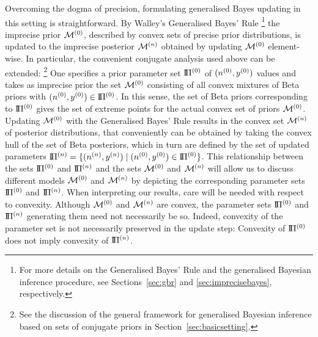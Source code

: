Overcoming the dogma of precision, formulating generalised Bayes
updating in this setting is straightforward. By Walley's Generalised
Bayes' Rule \parencite[\S 6]{1991:walley}%
\footnote{For more details on the Generalised Bayes' Rule and the generalised Bayesian inference procedure,
see Sections~\ref{sec:gbr} and \ref{sec:imprecisebayes}, respectively.}
the imprecise prior $\mathcal{M}^{(0)}$, described by convex sets of precise prior distributions,
is updated to the imprecise posterior $\mathcal{M}^{(n)}$ obtained by updating $\mathcal{M}^{(0)}$ element-wise.
In particular, the convenient conjugate analysis used above can be extended:%
\footnote{See the discussion of the general framework for generalised Bayesian inference
based on sets of conjugate priors in Section~\ref{sec:basicsetting}.}
One specifies a prior parameter set
$\text{I}\!\Pi^{(0)}$ of $(n^{(0)},y^{(0)})$ values and takes as imprecise
prior the set $\mathcal{M}^{(0)}$ consisting of  all convex mixtures of Beta
priors with $(n^{(0)}, y^{(0)}) \in \text{I}\!\Pi^{(0)}$. In this sense, the set of Beta
priors corresponding to $\text{I}\!\Pi^{(0)}$ gives the set of extreme points for
the actual convex set of priors $\mathcal{M}^{(0)}$. Updating $\mathcal{M}^{(0)}$ with the
Generalised Bayes' Rule results in the convex set $\mathcal{M}^{(n)}$ of posterior
distributions, that conveniently can be obtained by taking the
convex hull of the set of Beta posteriors, which in turn are defined
by the set of updated parameters
$\text{I}\!\Pi^{(n)} = \{(n^{(n)},y^{(n)}) \mid (n^{(0)}, y^{(0)}) \in \text{I}\!\Pi^{(0)}\}$.
This relationship between the sets $\text{I}\!\Pi^{(0)}$ and $\text{I}\!\Pi^{(n)}$ and the sets $\mathcal{M}^{(0)}$
and $\mathcal{M}^{(n)}$ will allow us to discuss different models $\mathcal{M}^{(0)}$ and $\mathcal{M}^{(n)}$ by depicting
the corresponding parameter sets $\text{I}\!\Pi^{(0)}$ and $\text{I}\!\Pi^{(n)}$. When interpreting our results,
care will be needed with respect to convexity. Although
$\mathcal{M}^{(0)}$ and $\mathcal{M}^{(n)}$ are convex, the parameter sets $\text{I}\!\Pi^{(0)}$ and $\text{I}\!\Pi^{(n)}$
generating them need not necessarily be so. %
Indeed, convexity of the parameter set is not necessarily preserved in the update
step: Convexity of $\text{I}\!\Pi^{(0)}$ does not imply convexity of $\text{I}\!\Pi^{(n)}$.

